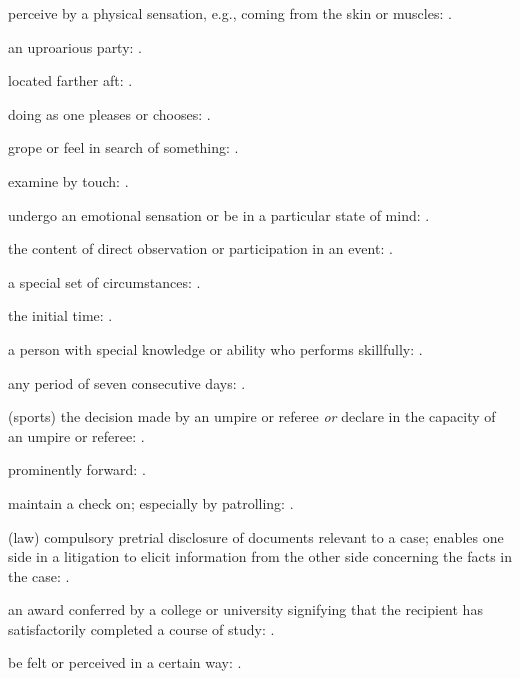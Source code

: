   perceive by a physical sensation, e.g., coming from the skin or muscles:   .

  an uproarious party:   .

  located farther aft: .

  doing as one pleases or chooses: .

  grope or feel in search of something: .

  examine by touch:   .

  undergo an emotional sensation or be in a particular state of mind:   .

  the content of direct observation or participation in an event: .

  a special set of circumstances:   .

  the initial time:   .

  a person with special knowledge or ability who performs skillfully: .

  any period of seven consecutive days:   .

  (sports) the decision made by an umpire or referee \textit{or} declare in the capacity of an umpire or referee: .

  prominently forward:   .

  maintain a check on; especially by patrolling: .

  (law) compulsory pretrial disclosure of documents relevant to a case; enables one side in a litigation to elicit information from the other side concerning the facts in the case: .

  an award conferred by a college or university signifying that the recipient has satisfactorily completed a course of study:   .

  be felt or perceived in a certain way: .

